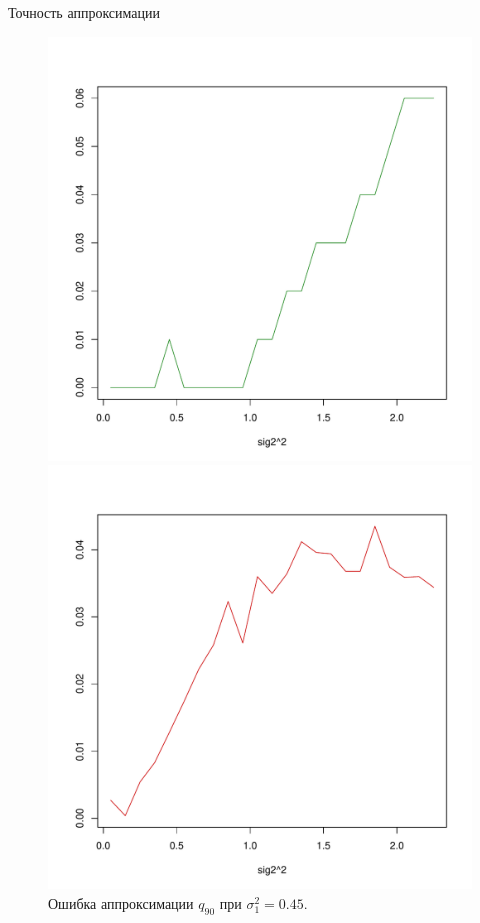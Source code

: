 \documentclass[ucs, notheorems, handout]{beamer}
\begin{document}
\begin{frame}{Точность аппроксимации }
	
	
	\begin{figure}[h]
		\begin{center}
			\begin{minipage}[h]{0.47\linewidth}
				\includegraphics[width=1\linewidth]{gr_new_1.pdf}
				\caption{Ошибка аппроксимации медианы при $\sigma_{1}^{2} = 0.45$.} %
				\label{ris7} %
			\end{minipage}
			\hfill
			\begin{minipage}[h]{0.47\linewidth}
				\includegraphics[width=1\linewidth]{gr_new_3.pdf}
				\caption{Ошибка аппроксимации $q_{90}$ при $\sigma_{1}^{2} = 0.45$.}
				\label{ris8}
			\end{minipage}


\end{center}
\end{figure}
\end{frame}
\end{document}
